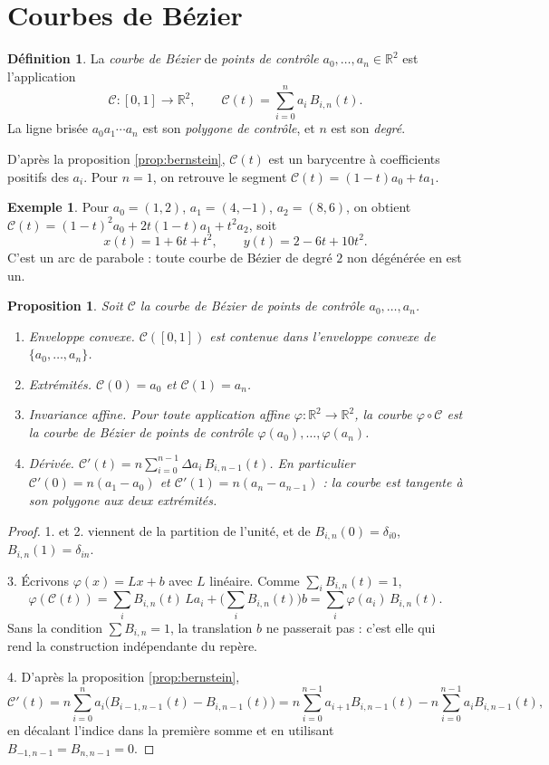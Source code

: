 \documentclass[11pt,a4paper]{article}
\theoremstyle{plain}
\newtheorem{proposition}[theoreme]{Proposition}
\theoremstyle{definition}
\newtheorem{definition}[theoreme]{Définition}
\newtheorem{exemple}[theoreme]{Exemple}
\theoremstyle{remark}
\newcommand{\R}{\mathbb{R}}
\newcommand{\C}{\mathcal{C}}
\begin{document}
\section{Courbes de Bézier}

\begin{definition}
La \emph{courbe de Bézier} de \emph{points de contrôle} $a_0,\dots,a_n\in\R^2$ est l'application
\[
  \C:[0,1]\to\R^2,\qquad \C(t)=\sum_{i=0}^na_i\,B_{i,n}(t) .
\]
La ligne brisée $a_0a_1\cdots a_n$ est son \emph{polygone de contrôle}, et $n$ est son \emph{degré}.
\end{definition}

D'après la proposition \ref{prop:bernstein}, $\C(t)$ est un barycentre à coefficients positifs des $a_i$. Pour $n=1$, on retrouve le segment $\C(t)=(1-t)a_0+ta_1$.

\begin{exemple}\label{ex:quadratique}
Pour $a_0=(1,2)$, $a_1=(4,-1)$, $a_2=(8,6)$, on obtient $\C(t)=(1-t)^2a_0+2t(1-t)a_1+t^2a_2$, soit
\[
  x(t)=1+6t+t^2,\qquad y(t)=2-6t+10t^2 .
\]
C'est un arc de parabole : toute courbe de Bézier de degré $2$ non dégénérée en est un.
\end{exemple}

\begin{proposition}\label{prop:proprietes}
Soit $\C$ la courbe de Bézier de points de contrôle $a_0,\dots,a_n$.
\begin{enumerate}[nosep]
\item \emph{Enveloppe convexe.} $\C([0,1])$ est contenue dans l'enveloppe convexe de $\{a_0,\dots,a_n\}$.
\item \emph{Extrémités.} $\C(0)=a_0$ et $\C(1)=a_n$.
\item \emph{Invariance affine.} Pour toute application affine $\varphi:\R^2\to\R^2$, la courbe $\varphi\circ\C$ est la courbe de Bézier de points de contrôle $\varphi(a_0),\dots,\varphi(a_n)$.
\item \emph{Dérivée.} $\C'(t)=n\sum_{i=0}^{n-1}\Delta a_i\,B_{i,n-1}(t)$. En particulier $\C'(0)=n(a_1-a_0)$ et $\C'(1)=n(a_n-a_{n-1})$ : la courbe est tangente à son polygone aux deux extrémités.
\end{enumerate}
\end{proposition}

\begin{proof}
1. et 2. viennent de la partition de l'unité, et de $B_{i,n}(0)=\delta_{i0}$, $B_{i,n}(1)=\delta_{in}$.

3. Écrivons $\varphi(x)=Lx+b$ avec $L$ linéaire. Comme $\sum_iB_{i,n}(t)=1$,
\[
  \varphi(\C(t))=\sum_iB_{i,n}(t)\,La_i+\Big(\sum_iB_{i,n}(t)\Big)b=\sum_i\varphi(a_i)\,B_{i,n}(t) .
\]
Sans la condition $\sum B_{i,n}=1$, la translation $b$ ne passerait pas : c'est elle qui rend la construction indépendante du repère.

4. D'après la proposition \ref{prop:bernstein},
\[
  \C'(t)=n\sum_{i=0}^na_i\big(B_{i-1,n-1}(t)-B_{i,n-1}(t)\big)=n\sum_{i=0}^{n-1}a_{i+1}B_{i,n-1}(t)-n\sum_{i=0}^{n-1}a_iB_{i,n-1}(t),
\]
en décalant l'indice dans la première somme et en utilisant $B_{-1,n-1}=B_{n,n-1}=0$.
\end{proof}
\end{document}

